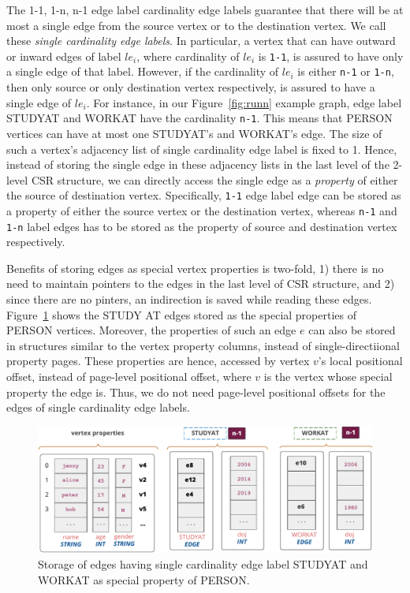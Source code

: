 The 1-1, 1-n, n-1 edge label cardinality edge labels guarantee that there will be at most a single edge from the source vertex or to the destination vertex. We call these \emph{single cardinality edge labels}. In particular, a vertex that can have outward or inward edges of label $le_i$, where cardinality of $le_i$ is \texttt{1-1}, is assured to have only a single edge of that label. However, if the cardinality of $le_i$ is either \texttt{n-1} or \texttt{1-n}, then only source or only destination vertex respectively, is assured to have a single edge of $le_i$. For instance, in our Figure~\ref{fig:runn} example graph, edge label STUDYAT and WORKAT have the cardinality \texttt{n-1}. This means that PERSON vertices can have at most one STUDYAT's and WORKAT's edge. The size of such a vertex's adjacency list of single cardinality edge label is fixed to 1. Hence, instead of storing the single edge in these adjacency lists in the last level of the 2-level CSR structure, we can directly access the single edge as a \emph{property} of either the source of destination vertex. Specifically, \texttt{1-1} edge label edge can be stored as a property of either the source vertex or the destination vertex, whereas \texttt{n-1} and \texttt{1-n} label edges has to be stored as the property of source and destination vertex respectively. 

Benefits of storing edges as special vertex properties is two-fold, 1) there is no need to maintain pointers to the edges in the last level of CSR structure, and 2) since there are no pinters, an indirection is saved while reading these edges. Figure~\ref{fig:single-cardinality-cols} shows the STUDY AT edges stored as the special properties of PERSON vertices. Moreover, the properties of such an edge $e$ can also be stored in structures similar to the vertex property columns, instead of single-directiional property pages. These properties are hence, accessed by vertex $v$'s local positional offset, instead of page-level positional offset, where $v$ is the vertex whose special property the edge is. Thus, we do not need page-level positional offsets for the edges of single cardinality edge labels.

\begin{figure}
	\vspace{-40pt}
	\hfill\includegraphics[scale=0.78]{img/single-cardinality-cols}\hspace*{\fill}
	\captionsetup{justification=centering}
	\caption{Storage of edges having single cardinality edge label STUDYAT and WORKAT as special property of PERSON.}
	\label{fig:single-cardinality-cols}
	\vspace{-5pt}
\end{figure}

